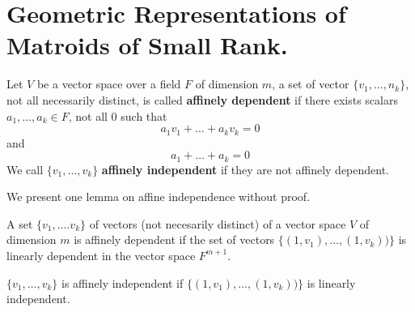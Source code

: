 
\section{Geometric Representations of Matroids of Small Rank.}

\begin{definition}
    Let $V$ be a vector space over a field $F$ of dimension $m$, a set of
    vector $\{v_1, \dots, n_k\}$, not all necessarily distinct, is called
    \textbf{affinely dependent} if there exists scalars $a_1, \dots, a_k \in F$,
    not all $0$ such that
    \begin{equation*}
        a_1v_1+\dots+a_kv_k=0
    \end{equation*}
    and
    \begin{equation*}
        a_1+\dots+a_k=0
    \end{equation*}
    We call $\{v_1, \dots, v_k\}$ \textbf{affinely independent} if they are not
    affinely dependent.
\end{definition}

We present one lemma on affine independence without proof.

\begin{lemma}\label{1.5.1}
    A set $\{v_1, \dots. v_k\}$ of vectors (not necesarily distinct) of a
    vector space $V$ of dimension $m$ is affinely dependent if the set of
    vectors $\{(1,v_1), \dots, (1,v_k))\}$ is linearly dependent in the vector
    space $F^{m+1}$.
\end{lemma}
\begin{corollary}
    $\{v_1, \dots, v_k\}$ is affinely independent if $\{(1,v_1), \dots,
    (1,v_k))\}$ is linearly independent.
\end{corollary}

